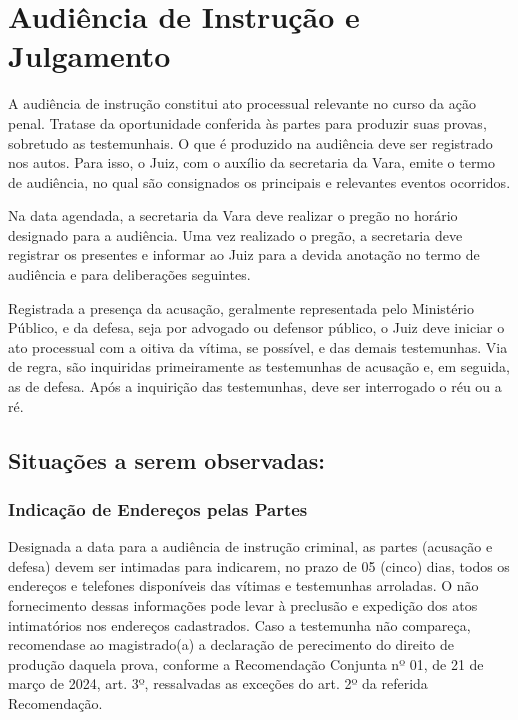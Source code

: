 \documentclass[letterpaper,10pt,brazil]{sphinxmanual}
\begin{document}
\sphinxstepscope


\section{Audiência de Instrução e Julgamento}
\label{\detokenize{07termoAIJ:audiencia-de-instrucao-e-julgamento}}\label{\detokenize{07termoAIJ::doc}}
\sphinxAtStartPar
A audiência de instrução constitui ato processual relevante no curso da ação penal.
Trata\sphinxhyphen{}se da oportunidade conferida às partes para produzir suas provas, sobretudo as testemunhais.
O que é produzido na audiência deve ser registrado nos autos. Para isso, o Juiz, com o auxílio da secretaria da Vara, emite o termo de audiência, no qual são consignados os principais e relevantes eventos ocorridos.

\sphinxAtStartPar
Na data agendada, a secretaria da Vara deve realizar o pregão no horário designado para a audiência.
Uma vez realizado o pregão, a secretaria deve registrar os presentes e informar ao Juiz para a devida anotação no termo de audiência e para deliberações seguintes.

\sphinxAtStartPar
Registrada a presença da acusação, geralmente representada pelo Ministério Público, e da defesa, seja por advogado ou defensor público, o Juiz deve iniciar o ato processual com a oitiva da vítima, se possível, e das demais testemunhas.
Via de regra, são inquiridas primeiramente as testemunhas de acusação e, em seguida, as de defesa.
Após a inquirição das testemunhas, deve ser interrogado o réu ou a ré.


\subsection{Situações a serem observadas:}
\label{\detokenize{07termoAIJ:situacoes-a-serem-observadas}}

\subsubsection{Indicação de Endereços pelas Partes}
\label{\detokenize{07termoAIJ:indicacao-de-enderecos-pelas-partes}}
\sphinxAtStartPar
Designada a data para a audiência de instrução criminal, as partes (acusação e defesa) devem ser intimadas para indicarem, no prazo de 05 (cinco) dias, todos os endereços e telefones disponíveis das vítimas e testemunhas arroladas.
O não fornecimento dessas informações pode levar à preclusão e expedição dos atos intimatórios nos endereços cadastrados.
Caso a testemunha não compareça, recomenda\sphinxhyphen{}se ao magistrado(a) a declaração de perecimento do direito de produção daquela prova, conforme a Recomendação Conjunta nº 01, de 21 de março de 2024, art. 3º, ressalvadas as exceções do art. 2º da referida Recomendação.
\end{document}
